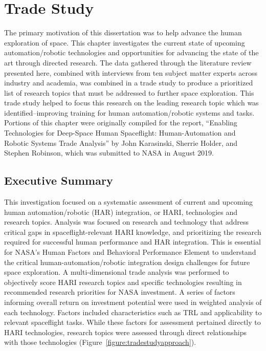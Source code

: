 \chapter{Trade Study}
\label{chapter:tradestudy}

The primary motivation of this dissertation was to help advance the human exploration of space.
This chapter investigates the current state of upcoming automation/robotic technologies and opportunities for advancing the state of the art through directed research.
The data gathered through the literature review presented here, combined with interviews from ten subject matter experts across industry and academia, was combined in a trade study to produce a prioritized list of research topics that must be addressed to further space exploration.
This trade study helped to focus this research on the leading research topic which was identified--improving training for human automation/robotic systems and tasks.
Portions of this chapter were originally compiled for the report, ``Enabling Technologies for Deep-Space Human Spaceflight: Human-Automation and Robotic Systems Trade Analysis'' by John Karasinski, Sherrie Holder, and Stephen Robinson, which was submitted to NASA in August 2019.






\section{Executive Summary}
This investigation focused on a systematic assessment of current and upcoming human automation/robotic (HAR) integration, or HARI, technologies and research topics.
Analysis was focused on research and technology that address critical gaps in spaceflight-relevant HARI knowledge, and prioritizing the research required for successful human performance and HAR integration.
This is essential for NASA's Human Factors and Behavioral Performance Element to understand the critical human-automation/robotic integration design challenges for future space exploration.
A multi-dimensional trade analysis was performed to objectively score HARI research topics and specific technologies resulting in recommended research priorities for NASA investment.
A series of factors informing overall return on investment potential were used in weighted analysis of each technology.
Factors included characteristics such as TRL and applicability to relevant spaceflight tasks.
While these factors for assessment pertained directly to HARI technologies, research topics were assessed through direct relationships with those technologies (Figure~\ref{figure:tradestudyapproach}).

